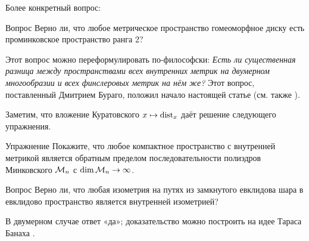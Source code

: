\documentclass[oneside,a4paper]{article}
\begin{document}
Более конкретный вопрос:

\begin{thm}{Вопрос}\label{mink-disk}
Верно ли, что любое метрическое пространство гомеоморфное диску есть проминковское пространство ранга 2?
\end{thm}

Этот вопрос можно переформулировать по-философски: 
\textit{Есть ли существенная разница между пространствами всех внутренних метрик на двумерном многообразии и всех финслеровых метрик на нём же?}
Этот вопрос, поставленный Дмитрием Бураго, положил начало настоящей статье (см. также \cite[теорема 1]{BIS}).

Заметим, что вложение Куратовского $x\mapsto \mathop{\rm dist}_x$ даёт решение следующего упражнения.

\begin{thm}{Упражнение}
Покажите, что любое компактное пространство с внутренней метрикой является обратным пределом последовательности полиэдров Минковского $\mathcal{M}_n$ с $\mathop{\rm dim}\nolimits \mathcal{M}_n\to\infty$.
\end{thm}

\begin{thm}{Вопрос}
Верно ли, что любая изометрия на путях из замкнутого евклидова шара в евклидово пространство является внутренней изометрией? 
\end{thm}

В двумерном случае ответ «да»;
доказательство можно построить на идее Тараса Банаха \cite{banakh}.
\end{document}

